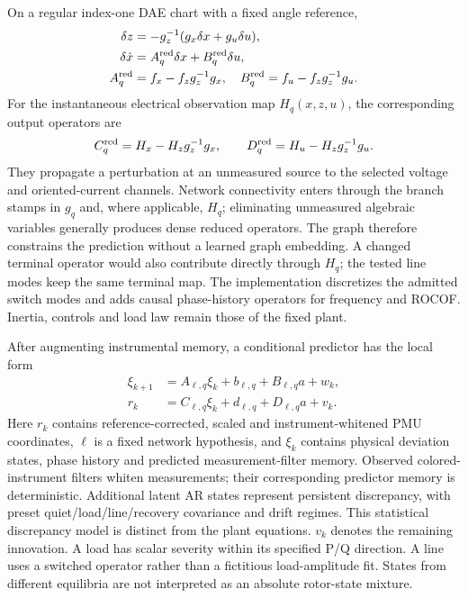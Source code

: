 On a regular index-one DAE chart with a fixed angle reference,
\begin{align}
 \delta z&=-g_z^{-1}(g_x\delta x+g_u\delta u),\nonumber\\
 \delta\dot x&=A_q^{\rm red}\delta x+B_q^{\rm red}\delta u,\nonumber\\
 A_q^{\rm red}&=f_x-f_zg_z^{-1}g_x,\quad
 B_q^{\rm red}=f_u-f_zg_z^{-1}g_u.
 \label{eq:narrative-reduction}
\end{align}
For the instantaneous electrical observation map $H_q(x,z,u)$, the
corresponding output operators are
\begin{equation}
 C_q^{\rm red}=H_x-H_zg_z^{-1}g_x,\qquad
 D_q^{\rm red}=H_u-H_zg_z^{-1}g_u.
 \label{eq:electrical-output-reduction}
\end{equation}
They propagate a perturbation at an unmeasured source to the selected
voltage and oriented-current channels. Network connectivity enters through
the branch stamps in $g_q$ and, where applicable, $H_q$; eliminating unmeasured algebraic
variables generally produces dense reduced operators. The graph therefore
constrains the prediction without a learned graph embedding. A changed
terminal operator would also contribute directly through $H_q$; the
tested line modes keep the same terminal map. The implementation discretizes the admitted
switch modes and adds causal phase-history operators for frequency and
ROCOF. Inertia, controls and load law remain those of the fixed plant.

After augmenting instrumental memory, a conditional predictor has the
local form
\begin{align}
 \xi_{k+1}&=A_{\ell,q}\xi_k+b_{\ell,q}+B_{\ell,q}a+w_k,\nonumber\\
 r_k&=C_{\ell,q}\xi_k+d_{\ell,q}+D_{\ell,q}a+v_k.
 \label{eq:implemented-predictor}
\end{align}
Here $r_k$ contains reference-corrected, scaled and instrument-whitened PMU coordinates, $\ell$ is a fixed
network hypothesis, and $\xi_k$ contains physical deviation states, phase
history and predicted measurement-filter memory. Observed colored-instrument
filters whiten measurements; their corresponding predictor memory is
deterministic. Additional latent AR states represent persistent discrepancy,
with preset quiet/load/line/recovery covariance and drift regimes. This
statistical discrepancy model is distinct from the plant equations.
$v_k$ denotes the remaining innovation. A load has scalar severity within
its specified P/Q direction. A line uses a switched operator rather than
a fictitious load-amplitude fit. States from different equilibria are not
interpreted as an absolute rotor-state mixture.

